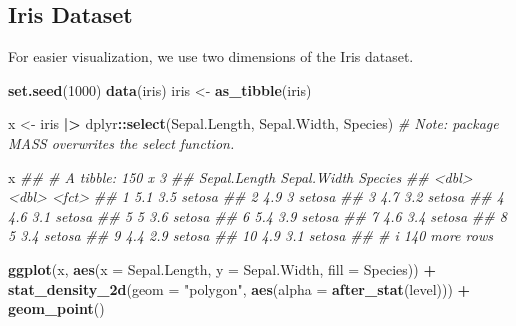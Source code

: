 \documentclass[
  notitlepage]{book}
\newenvironment{Shaded}{\begin{snugshade}}{\end{snugshade}}
\newcommand{\CommentTok}[1]{\textcolor[rgb]{0.56,0.35,0.01}{\textit{#1}}}
\newcommand{\DataTypeTok}[1]{\textcolor[rgb]{0.13,0.29,0.53}{#1}}
\newcommand{\DecValTok}[1]{\textcolor[rgb]{0.00,0.00,0.81}{#1}}
\newcommand{\ErrorTok}[1]{\textcolor[rgb]{0.64,0.00,0.00}{\textbf{#1}}}
\newcommand{\KeywordTok}[1]{\textcolor[rgb]{0.13,0.29,0.53}{\textbf{#1}}}
\newcommand{\NormalTok}[1]{#1}
\newcommand{\OperatorTok}[1]{\textcolor[rgb]{0.81,0.36,0.00}{\textbf{#1}}}
\newcommand{\StringTok}[1]{\textcolor[rgb]{0.31,0.60,0.02}{#1}}
\begin{document}
\hypertarget{iris-dataset}{%
\subsection{Iris Dataset}\label{iris-dataset}}

For easier visualization, we use two dimensions of the Iris dataset.

\begin{Shaded}
\begin{Highlighting}[]
\KeywordTok{set.seed}\NormalTok{(}\DecValTok{1000}\NormalTok{)}
\KeywordTok{data}\NormalTok{(iris)}
\NormalTok{iris \textless{}{-}}\StringTok{ }\KeywordTok{as\_tibble}\NormalTok{(iris)}

\NormalTok{x \textless{}{-}}\StringTok{ }\NormalTok{iris }\OperatorTok{|}\ErrorTok{\textgreater{}}\StringTok{ }\NormalTok{dplyr}\OperatorTok{::}\KeywordTok{select}\NormalTok{(Sepal.Length, Sepal.Width, Species)}
\CommentTok{\# Note: package MASS overwrites the select function.}

\NormalTok{x}
\CommentTok{\#\# \# A tibble: 150 x 3}
\CommentTok{\#\#    Sepal.Length Sepal.Width Species}
\CommentTok{\#\#           \textless{}dbl\textgreater{}       \textless{}dbl\textgreater{} \textless{}fct\textgreater{}  }
\CommentTok{\#\#  1          5.1         3.5 setosa }
\CommentTok{\#\#  2          4.9         3   setosa }
\CommentTok{\#\#  3          4.7         3.2 setosa }
\CommentTok{\#\#  4          4.6         3.1 setosa }
\CommentTok{\#\#  5          5           3.6 setosa }
\CommentTok{\#\#  6          5.4         3.9 setosa }
\CommentTok{\#\#  7          4.6         3.4 setosa }
\CommentTok{\#\#  8          5           3.4 setosa }
\CommentTok{\#\#  9          4.4         2.9 setosa }
\CommentTok{\#\# 10          4.9         3.1 setosa }
\CommentTok{\#\# \# i 140 more rows}
\end{Highlighting}
\end{Shaded}

\begin{Shaded}
\begin{Highlighting}[]
\KeywordTok{ggplot}\NormalTok{(x, }\KeywordTok{aes}\NormalTok{(}\DataTypeTok{x =}\NormalTok{ Sepal.Length, }
              \DataTypeTok{y =}\NormalTok{ Sepal.Width, }
              \DataTypeTok{fill =}\NormalTok{ Species)) }\OperatorTok{+}\StringTok{  }
\StringTok{  }\KeywordTok{stat\_density\_2d}\NormalTok{(}\DataTypeTok{geom =} \StringTok{"polygon"}\NormalTok{, }
                  \KeywordTok{aes}\NormalTok{(}\DataTypeTok{alpha =} \KeywordTok{after\_stat}\NormalTok{(level))) }\OperatorTok{+}
\StringTok{  }\KeywordTok{geom\_point}\NormalTok{()}
\end{Highlighting}
\end{Shaded}
\end{document}
